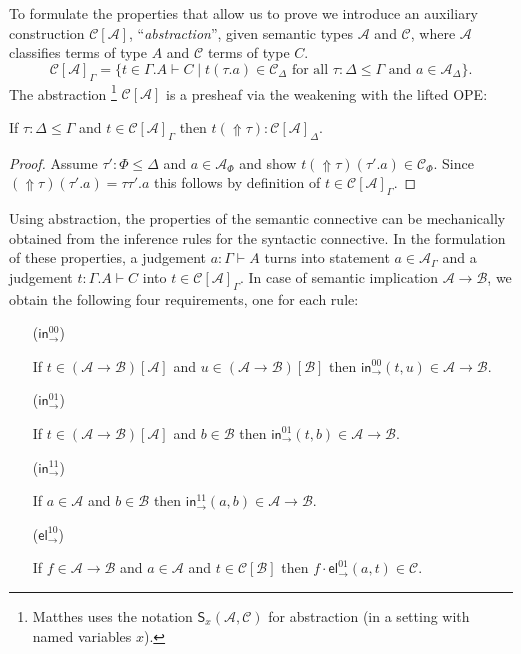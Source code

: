 \documentclass[a4paper,USenglish,cleveref, autoref, thm-restate]{lipics-v2019}
\makeatletter
\def\namedlabel#1#2{\begingroup
    #2%
    \def\@currentlabel{#2}%
    \phantomsection\label{#1}\endgroup
}
\newcommand{\tin}{\ensuremath{\mathsf{in}}}
\newcommand{\inn}[2]{\ensuremath{\tin_{#1}^{#2}}}
\newcommand{\tel}{\mathsf{el}}
\newcommand{\el}[2]{\ensuremath{\tel_{#1}^{#2}}}
\newcommand{\A}{\mathcal{A}}
\newcommand{\B}{\mathcal{B}}
\newcommand{\C}{\mathcal{C}}
\newcommand{\Up}{\mathop{\Uparrow}}
\makeatother
\begin{document}
To formulate the properties that allow us to prove  we
introduce an auxiliary construction $\C[\A]$, ``\emph{abstraction}'',
given semantic types $\A$ and $\C$, where $\A$ classifies terms of
type $A$ and $\C$ terms of type $C$.
\[
  \C[\A]_\Gamma =
  \{ t \in \Gamma.A \vdash C
     \mid t(\tau.a) \in \C_\Delta
     \mbox{ for all } \tau : \Delta \leq \Gamma
     \mbox{ and } a \in \A_\Delta
  \}
  .
\]
The abstraction%
\footnote{Matthes \cite[Sec.~6.2]{matthes:intersection} uses the
  notation $\mathsf{S}_x(\A,\C)$ for abstraction (in a setting with
  named variables $x$).}
$\C[\A]$ is a presheaf via the weakening with the
lifted OPE:
\begin{lemma}
  If $\tau : \Delta \leq \Gamma$ and $t \in \C[\A]_\Gamma$ then
  $t(\Up\tau) : \C[\A]_\Delta$.
\end{lemma}
\begin{proof}
  Assume $\tau' : \Phi \leq \Delta$ and $a \in \A_\Phi$ and show
  $t(\Up\tau)(\tau'.a) \in \C_\Phi$.  Since $(\Up\tau)(\tau'.a) =
  \tau\tau'.a$ this follows by definition of $t \in \C[\A]_\Gamma$.
\end{proof}

Using abstraction, the properties of the semantic connective can be
mechanically obtained from the inference rules for the syntactic
connective.  In the formulation of these properties, a judgement $a :
\Gamma \vdash A$ turns into statement $a \in \A_\Gamma$ and a
judgement $t : \Gamma.A \vdash C$ into $t \in \C[\A]_\Gamma$.
In case of semantic implication $\A \to \B$, we obtain the following
four requirements, one for each rule:
\begin{itemize}%
\setlength{\itemindent}{2.7em}

\item[\namedlabel{it:in00}{\rm(\inn\to{00})}]
  If $t \in (\A \to \B)[\A]$ and $u \in (\A \to \B)[\B]$ then
  $\inn\to{00}(t,u) \in \A \to \B$.

\item[\namedlabel{it:in01}{\rm(\inn\to{01})}]
  If $t \in (\A \to \B)[\A]$ and $b \in \B$ then
  $\inn\to{01}(t,b) \in \A \to \B$.

\item[\namedlabel{it:in11}{\rm(\inn\to{11})}]
  If $a \in \A$ and $b \in \B$ then $\inn\to{11}(a,b) \in \A \to \B$.

\item[\namedlabel{it:el10}{\rm(\el\to{10})}]
  If $f \in \A \to \B$ and $a \in \A$ and $t \in \C[\B]$ then
  $f \cdot \el\to{01}(a,t) \in \C$.

\end{itemize}
\end{document}
